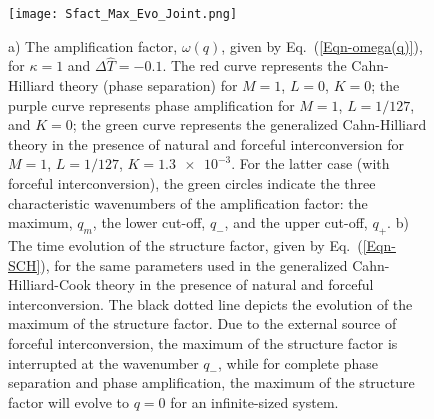\documentclass[5p,twocolumn]{elsarticle}
\begin{document}
\begin{figure}[h!]
    \centering
    \texttt{[image: Sfact\_Max\_Evo\_Joint.png]}
    \caption{ a) The amplification factor, $\omega(q)$, given by Eq.~(\ref{Eqn-omega(q)}), for $\kappa = 1$ and $\Delta \hat{T} = -0.1$. The red curve represents the Cahn-Hilliard theory (phase separation) for $M=1$, $L=0$, $K=0$; the purple curve represents phase amplification for $M=1$, $L=1/127$, and $K=0$; the green curve represents the generalized Cahn-Hilliard theory in the presence of natural and forceful interconversion for $M=1$, $L=1/127$, $K=\num{1.3e-3}$. For the latter case (with forceful interconversion), the green circles indicate the three characteristic wavenumbers of the amplification factor: the maximum, $q_m$, the lower cut-off, $q_-$, and the upper cut-off, $q_+$. b) The time evolution of the structure factor, given by Eq.~(\ref{Eqn-SCH}), for the same parameters used in the generalized Cahn-Hilliard-Cook theory in the presence of natural and forceful interconversion. The black dotted line depicts the evolution of the maximum of the structure factor. Due to the external source of forceful interconversion, the maximum of the structure factor is interrupted at the wavenumber $q_-$, while for complete phase separation and phase amplification, the maximum of the structure factor will evolve to $q=0$ for an infinite-sized system.}
    \label{Fig_AmpFactor}
\end{figure}
\end{document}
